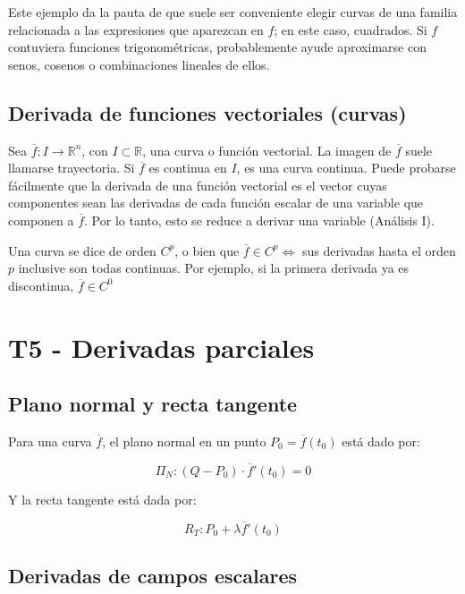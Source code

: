 \documentclass{article}
\renewcommand{\Bbb}{\mathbb}
\begin{document}
Este ejemplo da la pauta de que suele ser conveniente elegir curvas de una familia relacionada a las expresiones que aparezcan en $f$; en este caso, cuadrados. Si $f$ contuviera funciones trigonométricas, probablemente ayude aproximarse con senos, cosenos o combinaciones lineales de ellos.

\subsection{Derivada de funciones vectoriales (curvas)}

Sea $\overline{f}:I \rightarrow \Bbb R^n$, con $I \subset \Bbb R$, una curva o función vectorial. La imagen de $\overline{f}$ suele llamarse trayectoria. Si $\overline{f}$ es continua en $I$, es una curva continua. Puede probarse fácilmente que la derivada de una función vectorial es el vector cuyas componentes sean las derivadas de cada función escalar de una variable que componen a $\overline{f}$. Por lo tanto, esto se reduce a derivar una variable (Análisis I).

Una curva se dice de orden $C^p$, o bien que $\overline{f} \in C^p \Longleftrightarrow$ sus derivadas hasta el orden $p$ inclusive son todas continuas. Por ejemplo, si la primera derivada ya es discontinua, $\overline{f} \in C^0$

\section{T5 - Derivadas parciales}

\subsection{Plano normal y recta tangente}

Para una curva $\overline{f}$, el plano normal en un punto $P_0 = \overline{f}(t_0)$ está dado por:

\begin{equation}
\Pi_N : (Q - P_0) \cdot \overline{f}'(t_0) = 0
\end{equation}

Y la recta tangente está dada por:

\begin{equation}
R_T: P_0 + \lambda \overline{f}'(t_0)
\end{equation}

\subsection{Derivadas de campos escalares}
\end{document}
